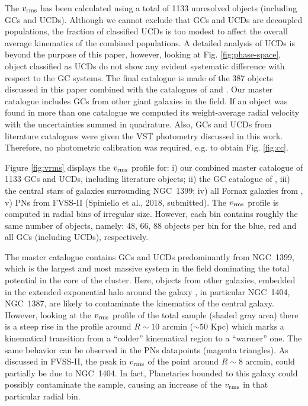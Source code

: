 \documentclass[useAMS,usenatbib]{mn2e}
\begin{document}
The $v_{\rm rms}$ has been calculated using a total of 1133 unresolved objects 
(including GCs and UCDs). Although we cannot exclude that GCs and UCDs are 
decoupled populations, 
the fraction of classified UCDs is too modest to affect the overall average 
kinematics of the combined populations. A detailed analysis of UCDs is beyond 
the purpose of this paper,
however, looking at Fig. \ref{fig:phase-space}, object classified as UCDs do 
not show any evident systematic difference with respect to the GC systems. 
The final catalogue is made of the 387 objects discussed in this paper 
combined with the catalogues of \citet{Bergond07} and \citet{Schuberth}. Our master catalogue
includes GCs from other giant galaxies in the field. If an 
object was found in more than one catalogue we computed its weight-average radial 
velocity with the uncertainties summed in quadrature. Also, GCs and UCDs from 
literature catalogues were given the VST photometry discussed in this work. 
Therefore, no photometric calibration was required, e.g. to obtain Fig. 
\ref{fig:cc}. 

Figure \ref{fig:vrms} displays the $v_{\rm rms}$ profile for: i) our combined master 
catalogue of 1133 GCs and UCDs, including literature objects; ii) the GC catalogue of 
\citet{Schuberth}, iii) the central stars of galaxies surrounding NGC~1399; iv) 
all Fornax galaxies from \citet{Drinkwater00}, v) PNs from FVSS-II (Spiniello et al., 2018, submitted).
The $v_{\rm rms}$ profile is computed in radial bins of irregular 
size. However, each bin contains roughly the same number of objects, namely: 
48, 66, 88 objects per bin for the blue, red and all GCs (including UCDs), respectively. 

The master catalogue contains GCs and UCDs predominantly from NGC~1399, which 
is the largest and most massive system in the field dominating the total 
potential in the core of the cluster. Here, objects from other galaxies, 
embedded in the extended exponential halo around the galaxy \citep{Iodice16}, 
in particular NGC~1404, NGC~1387, are likely to contaminate the 
kinematics of the central galaxy. However, looking at the $v_{\rm rms}$ 
profile of the total sample (shaded gray area) there is a steep rise in the 
profile around $R\sim10$ arcmin ($\sim 50$ Kpc) which marks a kinematical transition from a 
``colder'' kinematical region to a ``warmer'' one. 
The same behavior can be observed in the PNs datapoints 
(magenta triangles). As discussed in FVSS-II, the peak in $v_{\rm rms}$ 
of the point around $R\sim 8$ arcmin, could partially be due to NGC~1404. 
In fact, Planetaries bounded to this galaxy could possibly contaminate the sample, 
causing an increase of the $v_{\rm rms}$ in that particular radial bin.
\end{document}
